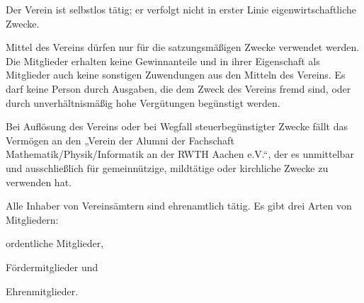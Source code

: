 \begin{contract}
	\item Der Verein ist selbstlos tätig; er verfolgt nicht in erster Linie eigen\-wirtschaftliche Zwecke.
	\item Mittel des Vereins dürfen nur für die satzungsmäßigen Zwecke verwendet werden. Die Mitglieder erhalten keine Gewinnanteile und in ihrer Eigenschaft als Mitglieder auch keine sonstigen Zuwendungen aus den Mitteln des Vereins. Es darf keine Person durch Ausgaben, die dem Zweck des Vereins fremd sind, oder durch unverhältnismäßig hohe Vergütungen begünstigt werden.
	\item Bei Auflösung des Vereins oder bei Wegfall steuerbegünstigter Zwecke fällt das Vermögen an den „Verein der Alumni der Fachschaft Mathematik/Physik/Informatik an der RWTH Aachen e.V.“, der es unmittelbar und ausschließlich für gemeinnützige, mildtätige oder kirchliche Zwecke zu verwenden hat.
	\item Alle Inhaber von Vereinsämtern sind ehrenamtlich tätig.
Es gibt drei Arten von Mitgliedern:
	\begin{subpara}
	\item ordentliche Mitglieder,
	\item Fördermitglieder und
	\item Ehrenmitglieder.
	\end{subpara}


\end{contract}
